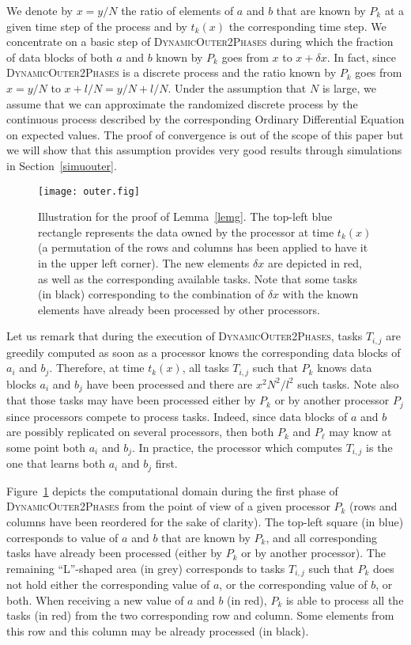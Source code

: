 \documentclass[a4paper,10pt]{article}
\newcommand{\stupidthreshold}{\textsc{Dynamic\-Outer\-2Phases}\xspace}
\newcommand{\ema}[1]{\ensuremath{#1}\xspace}
\newcommand{\dx}{\ema{\delta x}}
\begin{document}
We denote by $x=y/N$ the ratio of elements of $a$ and $b$ that are
known by $P_k$ at a given time step of the process and by
$t_k(x)$ the corresponding time step. We concentrate on a basic step
of \stupidthreshold during which the fraction of data blocks of both $a$ and
$b$ known by $P_k$ goes from $x$ to $x + \dx$. In fact, since \stupidthreshold
is a discrete process and the ratio known by $P_k$ goes from $x=y/N$
to $x+l/N = y/N + l/N$. Under the assumption that $N$ is large, we
assume that we can approximate the randomized discrete process by the
continuous process described by the corresponding Ordinary
Differential Equation on expected values. The proof of convergence is
out of the scope of this paper but we will show that this assumption
provides very good results through simulations in Section~\ref{simuouter}.



\begin{figure}[htbp]
  \centering
  \texttt{[image: outer.fig]}
  \caption{Illustration for the proof of Lemma~\ref{lemg}. The
    top-left blue  rectangle represents the data owned by
  the processor at time $t_k(x)$ (a permutation of the rows and
  columns has been applied to have it in the upper left corner). The new elements \dx are depicted in red, as well as the
  corresponding available tasks. Note that some tasks (in black)
  corresponding to the combination of \dx with the known elements have
already been processed by other processors.}
  \label{fig.evolv}
\end{figure}



Let us remark that during the execution of \stupidthreshold, tasks $T_{i,j}$
are greedily computed as soon as a processor knows the corresponding
data blocks of $a_i$ and $b_j$.  Therefore, at time $t_k(x)$, all
tasks $T_{i,j}$ such that $P_k$ knows data blocks $a_i$ and $b_j$ have
been processed and there are $x^2 N^2 / l^2$ such tasks. Note also
that those tasks may have been processed either by $P_k$ or by another
processor $P_j$ since processors compete to process tasks. Indeed,
since data blocks of $a$ and $b$ are possibly replicated on
several processors, then both $P_k$ and $P_\ell$ may know at some point
both $a_i$ and $b_j$. In practice, the processor which computes
$T_{i,j}$ is the one that learns both $a_i$ and $b_j$ first.


Figure~\ref{fig.evolv} depicts the computational domain during the
first phase of \stupidthreshold from the point of view of a given
processor $P_k$ (rows and columns have been reordered for the sake of
clarity). The top-left square (in blue) corresponds to value of $a$
and $b$ that are known by $P_k$, and all corresponding tasks have
already been processed (either by $P_k$ or by another processor). The
remaining ``L''-shaped area (in grey) corresponds to tasks $T_{i,j}$
such that $P_k$ does not hold either the corresponding value of $a$,
or the corresponding value of $b$, or both. When receiving a new value
of $a$ and $b$ (in red), $P_k$ is able to process all the tasks (in
red) from the two corresponding row and column. Some elements from
this row and this column may be already processed (in black).
\end{document}
